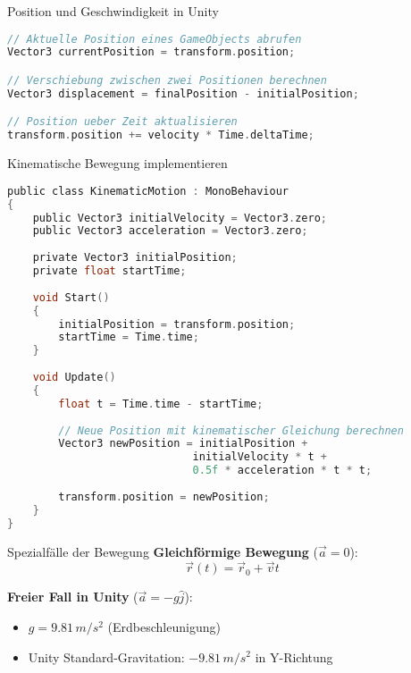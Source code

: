 \begin{code}{Position und Geschwindigkeit in Unity}
\begin{lstlisting}[language=C, style=basesmol]
// Aktuelle Position eines GameObjects abrufen
Vector3 currentPosition = transform.position;

// Verschiebung zwischen zwei Positionen berechnen
Vector3 displacement = finalPosition - initialPosition;

// Position ueber Zeit aktualisieren
transform.position += velocity * Time.deltaTime;
\end{lstlisting}
\end{code}

\begin{code}{Kinematische Bewegung implementieren}
\begin{lstlisting}[language=C, style=basesmol]
public class KinematicMotion : MonoBehaviour 
{
    public Vector3 initialVelocity = Vector3.zero;
    public Vector3 acceleration = Vector3.zero;
    
    private Vector3 initialPosition;
    private float startTime;
    
    void Start() 
    {
        initialPosition = transform.position;
        startTime = Time.time;
    }
    
    void Update() 
    {
        float t = Time.time - startTime;
        
        // Neue Position mit kinematischer Gleichung berechnen
        Vector3 newPosition = initialPosition + 
                             initialVelocity * t + 
                             0.5f * acceleration * t * t;
        
        transform.position = newPosition;
    }
}
\end{lstlisting}
\end{code}

\begin{concept}{Spezialfälle der Bewegung}
    \textbf{Gleichförmige Bewegung} ($\vec{a} = 0$):
    $$\vec{r}(t) = \vec{r}_0 + \vec{v}t$$
    
    \textbf{Freier Fall in Unity} ($\vec{a} = -g\hat{j}$):
    \begin{itemize}
        \item $g = 9.81 \, m/s^2$ (Erdbeschleunigung)
        \item Unity Standard-Gravitation: $-9.81 \, m/s^2$ in Y-Richtung
    \end{itemize}
\end{concept}

